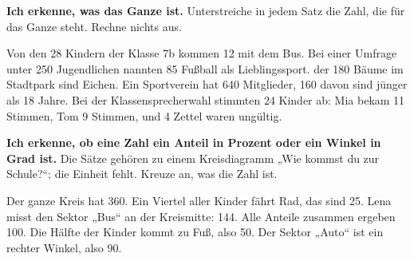 \setcounter{aufgabe}{11}

\begin{aufgabe}{\textbf{Ich erkenne, was das Ganze ist.} Unterstreiche in jedem Satz die Zahl, die für das Ganze steht. Rechne nichts aus.}
\begin{teile}
\teil Von den 28 Kindern der Klasse 7b kommen 12 mit dem Bus.
\teil Bei einer Umfrage unter 250 Jugendlichen nannten 85 Fußball als Lieblingssport.
 der 180 Bäume im Stadtpark sind Eichen.
\teil Ein Sportverein hat 640 Mitglieder, 160 davon sind jünger als 18 Jahre.
\teil Bei der Klassensprecherwahl stimmten 24 Kinder ab: Mia bekam 11 Stimmen, Tom 9 Stimmen, und 4 Zettel waren ungültig.
\end{teile}
\end{aufgabe}

\begin{aufgabe}{\textbf{Ich erkenne, ob eine Zahl ein Anteil in Prozent oder ein Winkel in Grad ist.} Die Sätze gehören zu einem Kreisdiagramm „Wie kommst du zur Schule?“; die Einheit fehlt. Kreuze an, was die Zahl ist.}
\begin{teile}
\teil Der ganze Kreis hat 360. \hfill {}\quad{}
\teil Ein Viertel aller Kinder fährt Rad, das sind 25. \hfill {}\quad{}
\teil Lena misst den Sektor „Bus“ an der Kreismitte: 144. \hfill {}\quad{}
\teil Alle Anteile zusammen ergeben 100. \hfill {}\quad{}
\teil Die Hälfte der Kinder kommt zu Fuß, also 50. \hfill {}\quad{}
\teil Der Sektor „Auto“ ist ein rechter Winkel, also 90. \hfill {}\quad{}
\end{teile}
\end{aufgabe}

